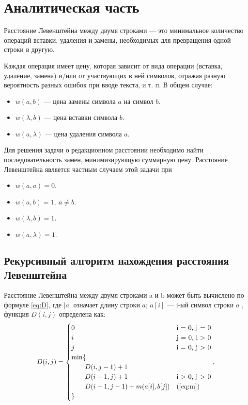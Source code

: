 \chapter{Аналитическая часть}

Расстояние Левенштейна \cite{Levenshtein} между двумя строками — это минимальное количество операций вставки, удаления и замены, необходимых для превращения одной строки в другую.

Каждая операция имеет цену, которая зависит от вида операции (вставка, удаление, замена) и/или от участвующих в ней символов, отражая разную вероятность разных ошибок при вводе текста, и т. п. 
В общем случае:
\begin{itemize}
	\item $w(a,b)$ — цена замены символа $a$ на символ $b$.
	\item $w(\lambda,b)$ — цена вставки символа $b$.
	\item $w(a,\lambda)$ — цена удаления символа $a$.
\end{itemize}


Для решения задачи о редакционном расстоянии необходимо найти последовательность замен, минимизирующую суммарную цену. Расстояние Левенштейна является частным случаем этой задачи при
\begin{itemize}
	\item $w(a,a)=0$.
	\item $w(a,b)=1, \medspace a \neq b$.
	\item $w(\lambda,b)=1$.
	\item $w(a,\lambda)=1$.
\end{itemize}

\clearpage

\section{Рекурсивный алгоритм нахождения расстояния Левенштейна}

Расстояние Левенштейна между двумя строками a и b может быть вычислено по формуле \ref{eq:D}, где $|a|$ означает длину строки $a$; $a[i]$ — i-ый символ строки $a$ , функция $D(i, j)$ определена как:
\begin{equation}
	\label{eq:D}
	D(i, j) = \begin{cases}
		0 &\text{i = 0, j = 0}\\
		i &\text{j = 0, i > 0}\\
		j &\text{i = 0, j > 0}\\
		\min \lbrace \\
			\qquad D(i, j-1) + 1\\
			\qquad D(i-1, j) + 1 &\text{i > 0, j > 0}\\
			\qquad D(i-1, j-1) + m(a[i], b[j]) &\text(\ref{eq:m})\\
		\rbrace
	\end{cases},
\end{equation}

